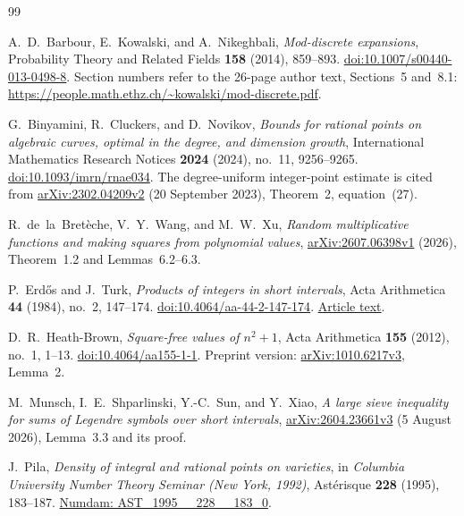 \begin{thebibliography}{99}

A.~D.~Barbour, E.~Kowalski, and A.~Nikeghbali,
\emph{Mod-discrete expansions},
Probability Theory and Related Fields \textbf{158}
(2014), 859--893.
\href{https://doi.org/10.1007/s00440-013-0498-8}
{doi:10.1007/s00440-013-0498-8}.
Section numbers refer to the 26-page author text, Sections~5 and~8.1:
\url{https://people.math.ethz.ch/~kowalski/mod-discrete.pdf}.

G.~Binyamini, R.~Cluckers, and D.~Novikov,
\emph{Bounds for rational points on algebraic curves, optimal
in the degree, and dimension growth},
International Mathematics Research Notices \textbf{2024} (2024),
no.~11, 9256--9265.
\href{https://doi.org/10.1093/imrn/rnae034}
{doi:10.1093/imrn/rnae034}.
The degree-uniform integer-point estimate is cited from
\href{https://arxiv.org/abs/2302.04209v2}
{arXiv:2302.04209v2} (20 September 2023),
Theorem~2, equation~(27).

R.~de~la~Bret\`eche, V.~Y.~Wang, and M.~W.~Xu,
\emph{Random multiplicative functions and making squares from
polynomial values},
\href{https://arxiv.org/abs/2607.06398v1}
{arXiv:2607.06398v1} (2026), Theorem~1.2 and
Lemmas~6.2--6.3.

P.~Erd\H{o}s and J.~Turk,
\emph{Products of integers in short intervals},
Acta Arithmetica \textbf{44} (1984), no.~2, 147--174.
\href{https://doi.org/10.4064/aa-44-2-147-174}
{doi:10.4064/aa-44-2-147-174}.
\href{https://www.renyi.hu/~p_erdos/1984-17.pdf}
{Article text}.

D.~R.~Heath-Brown,
\emph{Square-free values of \(n^2+1\)},
Acta Arithmetica \textbf{155} (2012), no.~1, 1--13.
\href{https://doi.org/10.4064/aa155-1-1}
{doi:10.4064/aa155-1-1}.
Preprint version:
\href{https://arxiv.org/abs/1010.6217v3}
{arXiv:1010.6217v3}, Lemma~2.

M.~Munsch, I.~E.~Shparlinski, Y.-C.~Sun, and Y.~Xiao,
\emph{A large sieve inequality for sums of Legendre symbols
over short intervals},
\href{https://arxiv.org/abs/2604.23661v3}
{arXiv:2604.23661v3} (5 August 2026), Lemma~3.3 and its proof.

J.~Pila,
\emph{Density of integral and rational points on varieties},
in \emph{Columbia University Number Theory Seminar
(New York, 1992)}, Ast\'erisque \textbf{228} (1995),
183--187.
\href{https://www.numdam.org/item/AST_1995__228__183_0/}
{Numdam: AST\_1995\_\_228\_\_183\_0}.


\end{thebibliography}
